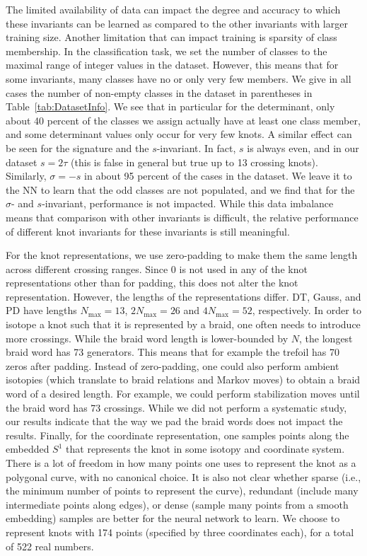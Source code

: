 \documentclass[11pt]{article}
\numberwithin{equation}{section}
\begin{document}
The limited availability of data can impact the degree and accuracy to which these invariants can be learned as compared to the other invariants with larger training size. Another limitation that can impact training is sparsity of class membership. In the classification task, we set the number of classes to the maximal range of integer values in the dataset. However, this means that for some invariants, many classes have no or only very few members. We give in all cases the number of non-empty classes in the dataset in parentheses in Table~\ref{tab:DatasetInfo}. We see that in particular for the determinant, only about 40 percent of the classes we assign actually have at least one class member, and some determinant values only occur for very few knots. A similar effect can be seen for the signature and the $s$-invariant. In fact, $s$ is always even, and in our dataset $s=2\tau$ (this is false in general but true up to 13 crossing knots). Similarly, $\sigma=-s$ in about 95 percent of the cases in the dataset. We leave it to the NN to learn that the odd classes are not populated, and we find that for the $\sigma$- and $s$-invariant, performance is not impacted. While this data imbalance means that comparison with other invariants is difficult, the relative performance of different knot invariants for these invariants is still meaningful.

For the knot representations, we use zero-padding to make them the same length across different crossing ranges. Since 0 is not used in any of the knot representations other than for padding, this does not alter the knot representation. However, the lengths of the representations differ. DT, Gauss, and PD have lengths $N_\text{max}=13$, $2N_\text{max}=26$ and $4N_\text{max}=52$, respectively. In order to isotope a knot such that it is represented by a braid, one often needs to introduce more crossings. While the braid word length is lower-bounded by $N$, the longest braid word has 73 generators. This means that for example the trefoil has 70 zeros after padding. Instead of zero-padding, one could also perform ambient isotopies (which translate to braid relations and Markov moves) to obtain a braid word of a desired length. For example, we could perform stabilization moves until the braid word has 73 crossings. While we did not perform a systematic study, our results indicate that the way we pad the braid words does not impact the results. Finally, for the coordinate representation, one samples points along the embedded $S^1$ that represents the knot in some isotopy and coordinate system. There is a lot of freedom in how many points one uses to represent the knot as a polygonal curve, with no canonical choice. It is also not clear whether sparse (i.e., the minimum number of points to represent the curve), redundant (include many intermediate points along edges), or dense (sample many points from a smooth embedding) samples are better for the neural network to learn. We choose to represent knots with 174 points (specified by three coordinates each), for a total of 522 real numbers.
\end{document}
